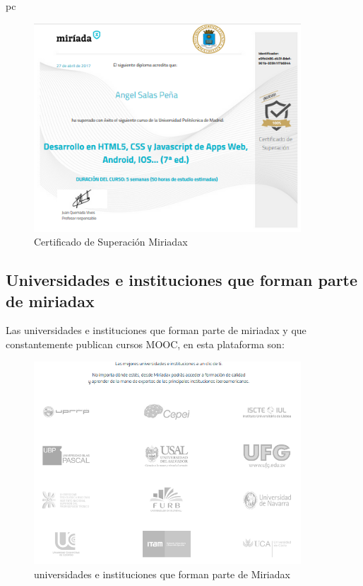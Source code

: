 pc\documentclass[a4paper,12pt,openany]{book}
\begin{document}
\begin{itemize}
\begin{figure}[ht]
  \centering
	\includegraphics[width=10cm]{miriada9.png}
\caption{Certificado de Superación Miriadax}
  \label{fig:miriada9}
\end{figure}
\end{itemize}

\clearpage
\subsection{Universidades e instituciones que forman parte de miriadax}

Las universidades e instituciones que forman parte de miriadax y que constantemente publican cursos MOOC, en esta plataforma son:

\begin{figure}[ht]
  \centering
	\includegraphics[width=10cm]{miriada10-1.png}
\caption{universidades e instituciones que forman parte de Miriadax}
  \label{fig:miriada10-1}
\end{figure}
\end{document}
